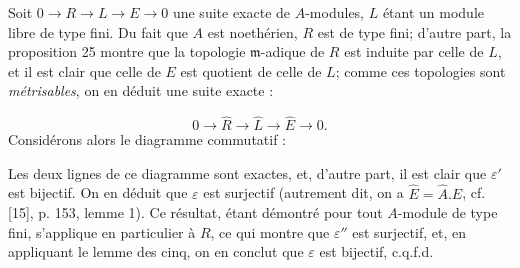 
Soit $0 \to R \to L \to E \to 0$ une suite exacte de $A$-modules, $L$ étant un module libre de type fini. Du fait que $A$ est noethérien, $R$ est de type fini; d'autre part, la proposition 25 montre que la topologie $\mathfrak{m}$-adique de $R$ est induite par celle de $L$, et il est clair que celle de $E$ est quotient de celle de $L$; comme ces topologies sont \emph{métrisables}, on en déduit une suite exacte :

\begin{equation*}
0 \to \hat{R} \to \hat{L} \to \hat{E} \to 0.
\end{equation*}
Considérons alors le diagramme commutatif :

\begin{center}
\end{center}
Les deux lignes de ce diagramme sont exactes, et, d'autre part, il est clair que $\varepsilon'$ est bijectif. On en déduit que $\varepsilon$ est surjectif (autrement dit, on a $\hat{E} = \hat{A}.E$, cf. [15], p. 153, lemme 1). Ce résultat, étant démontré pour tout $A$-module de type fini, s'applique en particulier à $R$, ce qui montre que $\varepsilon''$ est surjectif, et, en appliquant le lemme des cinq, on en conclut que $\varepsilon$ est bijectif, c.q.f.d.



